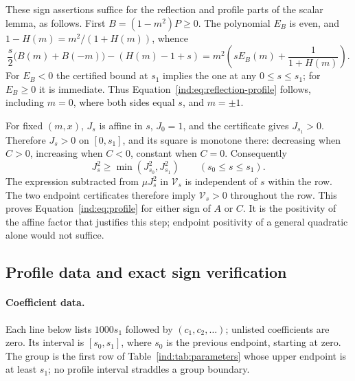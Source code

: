 These sign assertions suffice for the reflection and profile parts of
the scalar lemma, as follows.  First $B=(1-m^2)P\geq0$.
The polynomial $E_B$ is even, and $1-H(m)=m^2/(1+H(m))$, whence
\begin{equation}\label{sc:reflection-difference}
 \frac{s}{2}\bigl(B(m)+B(-m)\bigr)-(H(m)-1+s)
   =m^2\left(sE_B(m)+\frac1{1+H(m)}\right).
\end{equation}
For $E_B<0$ the certified bound at $s_1$ implies the one at any
$0\leq s\leq s_1$; for $E_B\geq0$ it is immediate.  Thus
Equation~\eqref{ind:eq:reflection-profile} follows, including $m=0$, where both
sides equal $s$, and $m=\pm1$.

For fixed $(m,x)$, $J_s$ is affine in $s$, $J_0=1$, and the certificate
gives $J_{s_1}>0$.  Therefore $J_s>0$ on $[0,s_1]$, and its square is
monotone there: decreasing when $C>0$, increasing when $C<0$, constant
when $C=0$.  Consequently
\[
 J_s^2\geq\min(J_{s_0}^2,J_{s_1}^2)
       \qquad(s_0\leq s\leq s_1).
\]
The expression subtracted from $\mu J_s^2$ in $\mathcal V_s$ is independent
of $s$ within the row.  The two endpoint certificates therefore imply
$\mathcal V_s>0$ throughout the row.  This proves
Equation~\eqref{ind:eq:profile} for either sign of $A$ or $C$.
It is the positivity of the affine factor that justifies this step;
endpoint positivity of a general quadratic alone would not suffice.

\subsection{Profile data and exact sign verification}\label{sc:bernstein}

\paragraph{Coefficient data.}
Each line below lists $1000s_1$ followed by $(c_1,c_2,\ldots)$;
unlisted coefficients are zero.  Its interval is $[s_0,s_1]$, where
$s_0$ is the previous endpoint, starting at zero.  The group is the
first row of Table~\ref{ind:tab:parameters} whose upper endpoint is at
least $s_1$; no profile interval straddles a group boundary.

